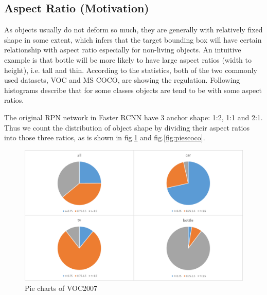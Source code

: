 \documentclass[10pt,twocolumn,letterpaper]{article}
\begin{document}
\subsection{Aspect Ratio (Motivation)}
As objects usually do not deform so much, they are generally with relatively fixed shape in some extent, which infers that the target bounding box will have certain relationship with aspect ratio especially for non-living objects. An intuitive example is that bottle will be more likely to have large aspect ratios (width to height), i.e. tall and thin. According to the statistics, both of the two commonly used datasets, VOC and MS COCO, are showing the regulation. Following histograms describe that for some classes objects are tend to be with some aspect ratios. 





The original RPN network in Faster RCNN \cite{fasterRCNN} have 3 anchor shape: 1:2, 1:1 and 2:1. Thus we count the distribution of object shape by dividing their aspect ratios into those three ratios, as is shown in fig.\ref{fig:piesvoc} and fig.\ref{fig:piescoco}.

\begin{figure}[h]
\centering
\includegraphics[width=0.7\linewidth]{pic/dist_pics/o_piescoc}
\caption{Pie charts of VOC2007}
\label{fig:piesvoc}
\end{figure}
\end{document}
